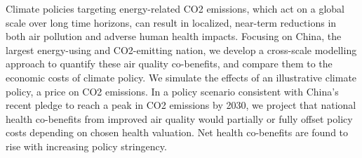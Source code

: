 Climate policies targeting energy-related CO2 emissions, which act on a global scale over long time horizons, can result in localized, near-term reductions in both air pollution and adverse human health impacts. Focusing on China, the largest energy-using and CO2-emitting nation, we develop a cross-scale modelling approach to quantify these air quality co-benefits, and compare them to the economic costs of climate policy. We simulate the effects of an illustrative climate policy, a price on CO2 emissions. In a policy scenario consistent with China’s recent pledge to reach a peak in CO2 emissions by 2030, we project that national health co-benefits from improved air quality would partially or fully offset policy costs depending on chosen health valuation. Net health co-benefits are found to rise with increasing policy stringency.
